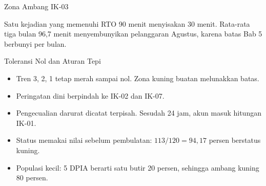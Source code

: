 \documentclass[aspectratio=169, table, 12pt]{beamer}
\begin{document}
\begin{frame}{{\Large Zona Ambang IK-03}}
  \vspace{4pt}
  \begin{center}
    \resizebox{0.85\textwidth}{!}{}
  \end{center}
  \vspace{2pt}
  \small Satu kejadian yang memenuhi RTO 90 menit menyisakan 30 menit. Rata-rata tiga bulan 96,7
  menit menyembunyikan pelanggaran Agustus, karena batas Bab 5 berbunyi per bulan.
\end{frame}

\begin{frame}{{\Large Toleransi Nol dan Aturan Tepi}}
  \vspace{6pt}
  \small
  \begin{itemize}
    \item Tren 3, 2, 1 tetap merah sampai nol. Zona kuning buatan melunakkan batas.
    \item Peringatan dini berpindah ke IK-02 dan IK-07.
    \item Pengecualian darurat dicatat terpisah. Sesudah 24 jam, akun masuk hitungan IK-01.
    \item Status memakai nilai sebelum pembulatan: $113 / 120 = 94{,}17$ persen berstatus kuning.
    \item Populasi kecil: 5 DPIA berarti satu butir 20 persen, sehingga ambang kuning 80 persen.
  \end{itemize}
\end{frame}
\end{document}

